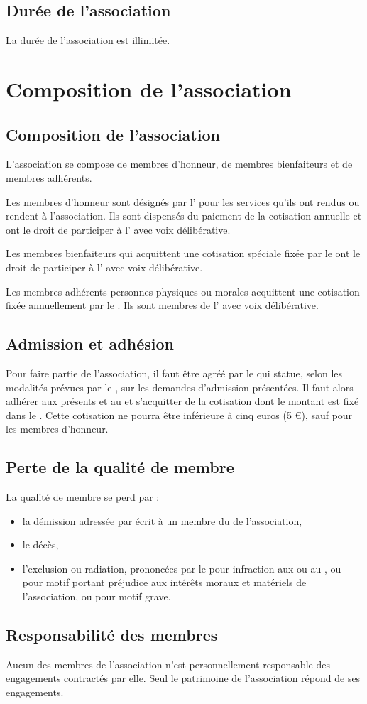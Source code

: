 \documentclass[a4paper,french,10pt]{article}
\newcommand{\article}[1]{\subsection{#1}\addtocounter{article}{1}}
\newcounter{article}
\begin{document}
\article{Durée de l’association}
\label{sec:duree}
La durée de l’association est illimitée.

\section{Composition de l’association}

\article{Composition de l’association}
\label{sec:composition}
L’association se compose de membres d'honneur, de membres bienfaiteurs
et de membres adhérents.

Les membres d'honneur sont désignés par l'\AG{} pour les
services qu'ils ont rendus ou rendent à l'association. Ils sont
dispensés du paiement de la cotisation annuelle et ont le droit de
participer à l'\AG{} avec voix délibérative.

Les membres bienfaiteurs qui acquittent une cotisation spéciale fixée
par le \RI{} ont le droit de participer à l'\AG{} avec voix délibérative.

Les membres adhérents personnes physiques ou morales acquittent une
cotisation fixée annuellement par le \RI{}. Ils sont
membres de l'\AG{} avec voix délibérative.

\article{Admission et adhésion}
\label{sec:admission}

Pour faire partie de l’association, il faut être agréé par le
\bureau{} qui statue, selon les modalités prévues par le \RI{}, sur
les demandes d'admission présentées. Il faut alors adhérer aux
présents \statuts{} et au \RI{} et s’acquitter de la cotisation dont
le montant est fixé dans le \RI{}. Cette cotisation ne pourra être inférieure à cinq euros (5 \euro{}), sauf pour les membres d'honneur.

\article{Perte de la qualité de membre}
\label{sec:perte}
La qualité de membre se perd par :
\begin{itemize}
\item la démission adressée par écrit à un membre du \bureau{} de l'association,

\item le décès,

\item l'exclusion ou radiation, prononcées par le \bureau{} pour infraction
aux \statuts{} ou au \RI{}, ou pour motif portant préjudice
aux intérêts moraux et matériels de l'association, ou pour motif
grave.
\end{itemize}


\article{Responsabilité des membres}
\label{sec:responsabilite}
Aucun des membres de l’association n’est personnellement responsable
des engagements contractés par elle. Seul le patrimoine de
l’association répond de ses engagements.
\end{document}
